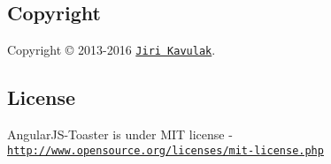 \subsection*{Copyright}

Copyright © 2013-\/2016 \href{https://twitter.com/jirikavi}{\tt Jiri Kavulak}.

\subsection*{License}

Angular\+J\+S-\/\+Toaster is under M\+IT license -\/ \href{http://www.opensource.org/licenses/mit-license.php}{\tt http\+://www.\+opensource.\+org/licenses/mit-\/license.\+php} 